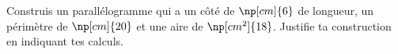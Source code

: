 \documentclass{classe-tex3R}
\begin{document}


\begin{enonce}
	Construis un parallélogramme qui a un côté de $\np[cm]{6}$ de longueur, un périmètre de $\np[cm]{20}$ et une aire de $\np[cm^2]{18}$. Justifie ta construction en indiquant tes calculs.
\end{enonce}
\end{document}
